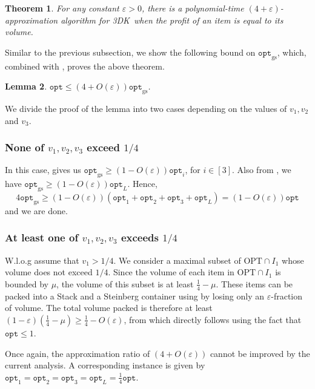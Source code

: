 \documentclass[10pt,a4paper]{amsart}
\newcommand{\mt}[1]{#1}
\newcommand{\eps}{\varepsilon}
\renewcommand{\epsilon}{\varepsilon} %
\newcommand{\tdk}{\textsc{3DK}}
\newtheorem{theorem}{Theorem}[section]
\newtheorem{lemma}[theorem]{Lemma}
\theoremstyle{definition}
\newcommand{\alg}{\mathtt{opt}_{\mathrm{gs}}}
\newcommand{\opt}{\mathtt{opt}}
\newcommand{\OPT}{\mathrm{OPT}}
\begin{document}
\begin{theorem}
    \label{thm:3dkp}
   For any constant $\eps>0$, there is a polynomial-time $(4 +\eps)$-approximation algorithm for \tdk~when the profit of an item is equal to its volume. 
\end{theorem}

Similar to the previous subsection, we show the following bound on $\alg$, which, combined with , proves the above theorem.

\begin{lemma}
\label{lem:3dkvolume}
    $\opt \le (4+O(\epsilon))\alg$.
\end{lemma}

We divide the proof of the lemma into two cases depending on the values of $v_1, v_2$ and $v_3$.

\subsubsection{None of \texorpdfstring{$v_1,v_2,v_3$}{v1, v2, v3} exceed \texorpdfstring{$1/4$}{1/4}}
In this case,  gives us $\alg \ge (1-O(\epsilon))\opt_i$, for $i\in [3]$. Also from , we have $\alg \ge (1-O(\epsilon))\opt_L$. Hence,
\[ 4\alg \ge (1-O(\epsilon))(\opt_1 + \opt_2 + \opt_3 + \opt_L) = (1-O(\epsilon))\opt\]
and we are done.

\subsubsection{At least one of \texorpdfstring{$v_1,v_2,v_3$}{v1, v2, v3} exceeds \texorpdfstring{$1/4$}{1/4}}
W.l.o.g assume that $v_1 > 1/4$. We consider a maximal subset of $\OPT\cap I_1$ whose volume does not exceed $1/4$. Since the volume of each item in $\OPT\cap I_1$ is bounded by $\mu$, the volume of this subset is at least $\frac{1}{4}-\mu$. These items can be packed into a Stack and a Steinberg container using  by losing only an $\epsilon$-fraction of volume. The total volume packed is therefore at least $(1-\epsilon)\left(\frac{1}{4}-\mu\right) \ge \frac{1}{4}-O(\epsilon)$, from which  directly follows using the fact that $\opt\le 1$.  

\mt{Once again, the approximation ratio of $(4+O(\eps))$ cannot be improved by the current analysis. A corresponding instance is given by $\opt_1=\opt_2=\opt_3=\opt_L=\frac{1}{4}\opt$.}
\end{document}
